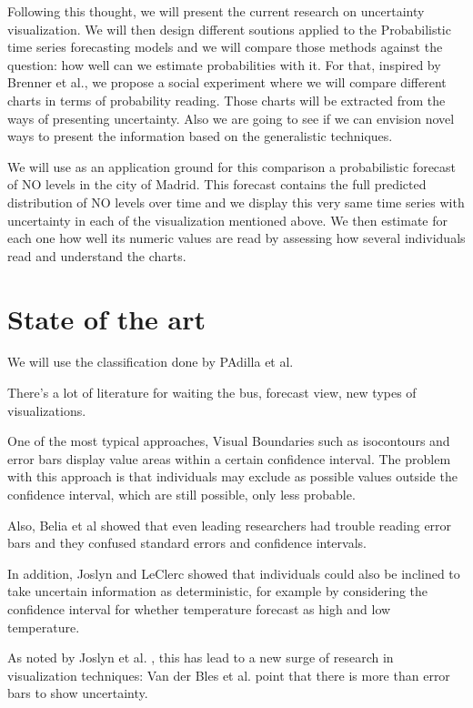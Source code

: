 \documentclass[a4paper,3p,sort&compress]{elsarticle}
\begin{document}
Following this thought, we will present the current research on uncertainty visualization. We will then
design different soutions applied to the Probabilistic time series forecasting models and 
we will compare those methods against the question: how well can we estimate probabilities with it. 
For that, inspired by Brenner et al., we propose a social experiment where we will compare different charts 
in terms of probability reading. Those charts will be extracted from the ways of presenting uncertainty.
Also we are going to see if we can envision novel ways to present the information based on the generalistic techniques.

We will use as an application ground for this comparison a probabilistic forecast of NO levels 
in the city of Madrid. This forecast contains the full predicted distribution of NO levels over time
and we display this very same time series with uncertainty in each of the visualization mentioned above. 
We then estimate for each one how well its numeric values are read by assessing how several individuals read 
and understand the charts.

\section{State of the art}
\label{sec:results}

We will use the classification done by PAdilla et al. 

There's a lot of literature for 
waiting the bus, forecast view, new types of visualizations.

One of the most typical approaches, Visual Boundaries such as isocontours and error 
bars display value areas within a certain confidence interval. The problem with this approach is 
that individuals may exclude as possible values outside the confidence interval, which are still 
possible, only less probable. 

Also, Belia et al \cite{belia_researchers_2005} showed that even leading researchers had 
trouble reading error bars and they confused 
standard errors and confidence intervals. 

In addition, Joslyn and LeClerc showed that individuals could also be inclined to take uncertain 
information as deterministic, for example by considering the confidence interval for whether temperature 
forecast as high and low temperature. 

As noted by Joslyn et al. \cite{joslyn_communicating_2010}, this has lead to a new surge of 
research in visualization techniques: Van 
der Bles et al. \cite{van_der_bles_communicating_nodate} point that there is more than 
error bars to show uncertainty. 
\end{document}

